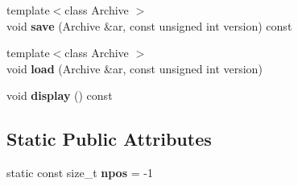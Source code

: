 \begin{CompactItemize}
\item 
\hypertarget{classbbt__string_019567bd44964ee65280d4b8a98b1710}{
{\footnotesize template$<$class Archive $>$ }\\void \textbf{save} (Archive \&ar, const unsigned int version) const }
\label{classbbt__string_019567bd44964ee65280d4b8a98b1710}

\item 
\hypertarget{classbbt__string_a532809f67fc37b3dedd99f8ae95caae}{
{\footnotesize template$<$class Archive $>$ }\\void \textbf{load} (Archive \&ar, const unsigned int version)}
\label{classbbt__string_a532809f67fc37b3dedd99f8ae95caae}

\item 
\hypertarget{classbbt__string_fdf5ea87b3d0316efed753ea5ca11f83}{
void \textbf{display} () const }
\label{classbbt__string_fdf5ea87b3d0316efed753ea5ca11f83}

\end{CompactItemize}
\subsection*{Static Public Attributes}
\begin{CompactItemize}
\item 
\hypertarget{classbbt__string_37ee6487025e0088c0741ff4f946b8d1}{
static const size\_\-t \textbf{npos} = -1}
\label{classbbt__string_37ee6487025e0088c0741ff4f946b8d1}

\end{CompactItemize}
